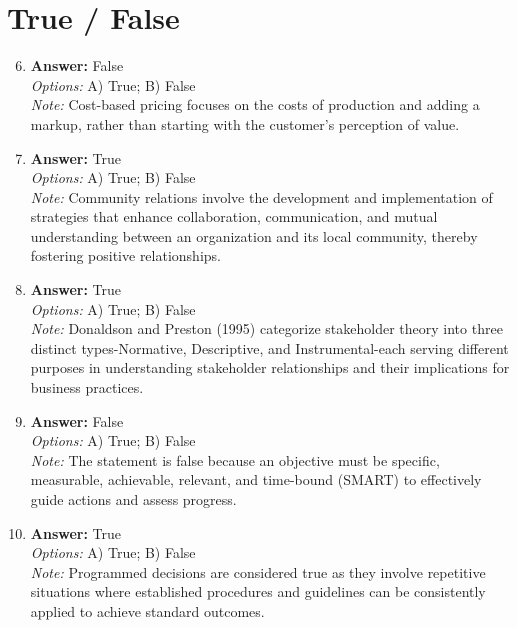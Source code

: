 \documentclass[12pt]{article}
\begin{document}
\section*{True / False}
\begin{enumerate}[label=\arabic*.]
\setcounter{enumi}{5}
\item \textbf{Answer:} False
\\ \textit{Options:} A) True; B) False
\\ \textit{Note:} Cost-based pricing focuses on the costs of production and adding a markup, rather than starting with the customer's perception of value.
\item \textbf{Answer:} True
\\ \textit{Options:} A) True; B) False
\\ \textit{Note:} Community relations involve the development and implementation of strategies that enhance collaboration, communication, and mutual understanding between an organization and its local community, thereby fostering positive relationships.
\item \textbf{Answer:} True
\\ \textit{Options:} A) True; B) False
\\ \textit{Note:} Donaldson and Preston (1995) categorize stakeholder theory into three distinct types-Normative, Descriptive, and Instrumental-each serving different purposes in understanding stakeholder relationships and their implications for business practices.
\item \textbf{Answer:} False
\\ \textit{Options:} A) True; B) False
\\ \textit{Note:} The statement is false because an objective must be specific, measurable, achievable, relevant, and time-bound (SMART) to effectively guide actions and assess progress.
\item \textbf{Answer:} True
\\ \textit{Options:} A) True; B) False
\\ \textit{Note:} Programmed decisions are considered true as they involve repetitive situations where established procedures and guidelines can be consistently applied to achieve standard outcomes.
\end{enumerate}
\end{document}
